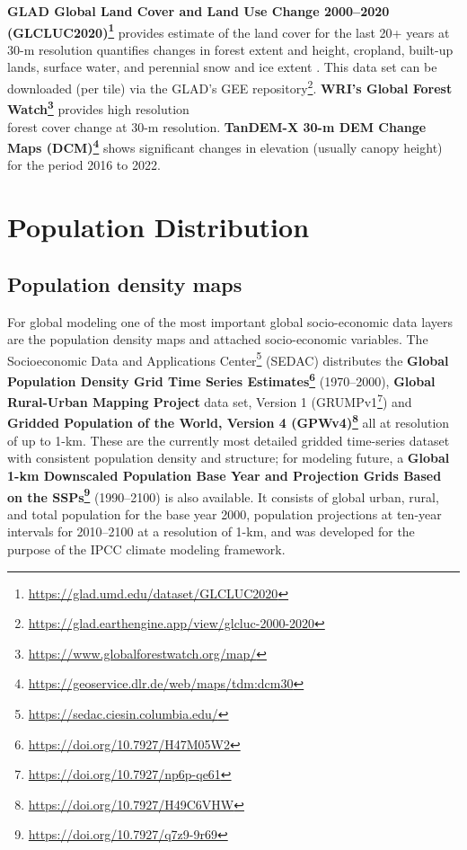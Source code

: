 \documentclass[
  graybox,natbib,nospthms]{svmono}
\renewcommand{\href}[2]{#2 (\url{#1})}
\renewcommand{\href}[2]{#2\footnote{\url{#1}}}
\begin{document}
\textbf{\href{https://glad.umd.edu/dataset/GLCLUC2020}{GLAD Global Land Cover and Land Use Change 2000--2020 (GLCLUC2020)}} provides estimate of the land cover for the last 20+ years at 30-m resolution quantifies changes in forest extent
and height, cropland, built-up lands, surface water, and perennial snow and ice extent \citep{Potapov2022}.
This data set can be downloaded (per tile) via the \href{https://glad.earthengine.app/view/glcluc-2000-2020}{GLAD's GEE repository}.
\textbf{\href{https://www.globalforestwatch.org/map/}{WRI's Global Forest Watch}} provides high resolution\\
forest cover change at 30-m resolution.
\textbf{\href{https://geoservice.dlr.de/web/maps/tdm:dcm30}{TanDEM-X 30-m DEM Change Maps (DCM)}} shows significant changes in elevation (usually canopy height) for the period 2016 to 2022.

\hypertarget{population-distribution}{%
\section{Population Distribution}\label{population-distribution}}

\hypertarget{population-density-maps}{%
\subsection{Population density maps}\label{population-density-maps}}

For global modeling one of the most important global socio-economic data layers are the population density
maps and attached socio-economic variables. The \href{https://sedac.ciesin.columbia.edu/}{Socioeconomic Data and Applications Center} (SEDAC) distributes the \textbf{\href{https://doi.org/10.7927/H47M05W2}{Global Population Density Grid Time Series Estimates}} (1970--2000),
\textbf{Global Rural-Urban Mapping Project} data set, Version 1 (\href{https://doi.org/10.7927/np6p-qe61}{GRUMPv1})
and \textbf{\href{https://doi.org/10.7927/H49C6VHW}{Gridded Population of the World, Version 4 (GPWv4)}} all at resolution of up to 1-km. These are the currently most
detailed gridded time-series dataset with consistent population density and structure; for modeling future,
a \textbf{\href{https://doi.org/10.7927/q7z9-9r69}{Global 1-km Downscaled Population Base Year and Projection Grids Based on the SSPs}} (1990--2100) \citep{gao2020global} is also available. It consists of global urban, rural, and total population
for the base year 2000, population projections at ten-year intervals for 2010--2100
at a resolution of 1-km, and was developed for the purpose of the IPCC climate modeling framework.
\end{document}
